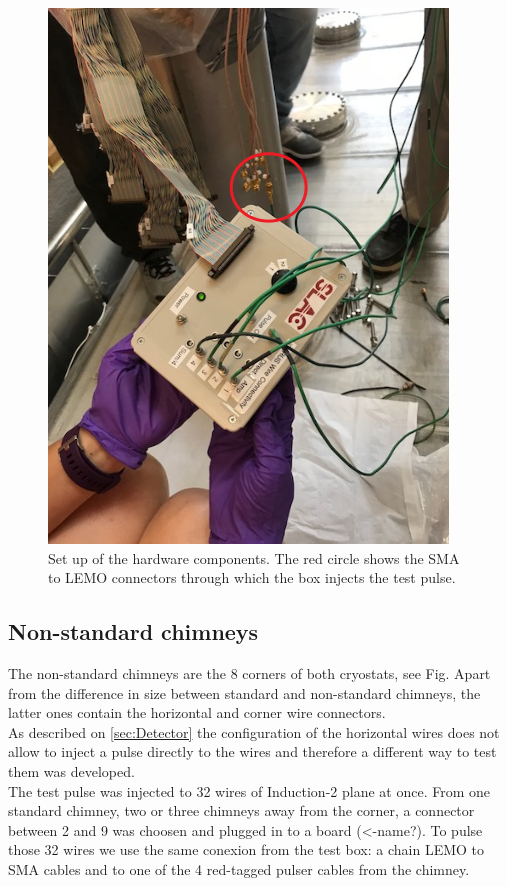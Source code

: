 \begin{enumerate}
\begin{figure}[H]
\centering
\includegraphics[scale=0.6]{fig/setup}
\caption{Set up of the hardware components. The red circle shows the SMA to LEMO connectors through which the box injects the test pulse.}
\end{figure}




\end{enumerate}




\subsection{Non-standard chimneys}
\label{ssec:nonStd_chimn}

The non-standard chimneys are the 8 corners of both cryostats, see Fig. Apart from the difference in size between standard and non-standard chimneys, the latter ones contain the horizontal and corner wire connectors. \\

As described on \cref{sec:Detector} the configuration of the horizontal wires does not allow to inject a pulse directly to the wires and therefore a different way to test them was developed. \\
The test pulse was injected to 32 wires of Induction-2 plane at once. From one standard chimney, two or three chimneys away from the corner, a connector between 2 and 9 was choosen and plugged in to a board (<-name?). To pulse those 32 wires we use the same conexion from the test box: a chain LEMO to SMA cables and to one of the 4 red-tagged pulser cables from the chimney.  

